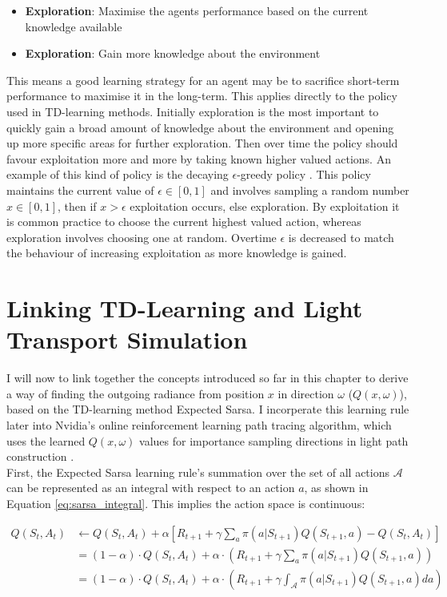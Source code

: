 \documentclass[../dissertation.tex]{subfiles}
\begin{document}
\begin{itemize}
\item \textbf{Exploration}: Maximise the agents performance based on the current knowledge available
\item \textbf{Exploration}: Gain more knowledge about the environment
\end{itemize}

This means a good learning strategy for an agent may be to sacrifice short-term performance to maximise it in the long-term. This applies directly to the policy used in TD-learning methods. Initially exploration is the most important to quickly gain a broad amount of knowledge about the environment and opening up more specific areas for further exploration. Then over time the policy should favour exploitation more and more by taking known higher valued actions. An example of this kind of policy is the decaying $\epsilon$-greedy policy \cite{sutton2011reinforcement}. This policy maintains the current value of $\epsilon \in [0,1]$ and involves sampling a random number $x \in [0,1]$, then if $x > \epsilon$ exploitation occurs, else exploration. By exploitation it is common practice to choose the current highest valued action, whereas exploration involves choosing one at random. Overtime $\epsilon$ is decreased to match the behaviour of increasing exploitation as more knowledge is gained.

\section{Linking TD-Learning and Light Transport Simulation}
\label{sec:td_light_transport}
I will now to link together the concepts introduced so far in this chapter to derive a way of finding the outgoing radiance from position $x$ in direction $\omega$ ($Q(x, \omega)$), based on the TD-learning method Expected Sarsa. I incorperate this learning rule later into Nvidia's online reinforcement learning path tracing algorithm, which uses the learned $Q(x, \omega)$ values for importance sampling directions in light path construction \cite{dahm2017learning}.\\

First, the Expected Sarsa learning rule's summation over the set of all actions $\mathcal{A}$ can be represented as an integral with respect to an action $a$, as shown in Equation \ref{eq:sarsa_integral}. This implies the action space is continuous:

\begin{align}
Q(S_t, A_t) & \leftarrow Q(S_t, A_t) + \alpha [R_{t+1} + \gamma \sum_a \pi(a| S_{t+1}) Q(S_{t+1}, a) - Q(S_t, A_t)]\\
& =  (1 - \alpha) \cdot Q(S_{t},A_t) + \alpha \cdot \left( R_{t+1} + \gamma \sum_a \pi(a|S_{t+1}) Q(S_{t+1}, a) \right)\\
& = (1 - \alpha) \cdot Q(S_{t},A_t) + \alpha \cdot \left( R_{t+1} + \gamma \int_\mathcal{A} \pi(a|S_{t+1}) Q(S_{t+1}, a) da \right)
 \label{eq:sarsa_integral}
\end{align}
\end{document}
